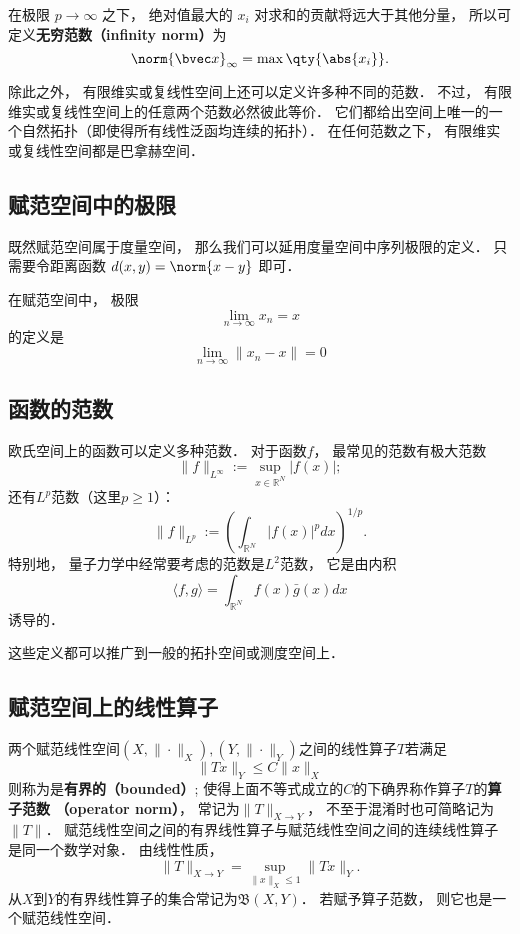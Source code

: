 在极限 $p \to \infty$ 之下， 绝对值最大的 $x_i$ 对求和的贡献将远大于其他分量， 所以可定义\textbf{无穷范数（infinity norm）}为
\begin{equation}
\norm{\bvec x}_\infty = \max \qty{\abs{x_i}}.
\end{equation}

除此之外， 有限维实或复线性空间上还可以定义许多种不同的范数． 不过， 有限维实或复线性空间上的任意两个范数必然彼此等价． 它们都给出空间上唯一的一个自然拓扑（即使得所有线性泛函均连续的拓扑）． 在任何范数之下， 有限维实或复线性空间都是巴拿赫空间．

\subsection{赋范空间中的极限}
既然赋范空间属于度量空间， 那么我们可以延用度量空间中序列极限的定义． 只需要令距离函数 $d(x, y) = \norm{x - y}$ 即可．

在赋范空间中， 极限
\begin{equation}
\lim_{n\to\infty} x_n = x
\end{equation}
的定义是
\begin{equation}
\lim_{n\to\infty} \|{x_n - x}\|= 0
\end{equation}

\subsection{函数的范数}
欧氏空间上的函数可以定义多种范数． 对于函数$f$， 最常见的范数有极大范数
$$
\|f\|_{L^\infty}:=\sup_{x\in\mathbb{R}^N}|f(x)|;
$$
还有$L^p$范数（这里$p\geq1$）：
$$
\|f\|_{L^p}:=\left(\int_{\mathbb{R}^N}|f(x)|^pdx\right)^{1/p}.
$$
特别地， 量子力学中经常要考虑的范数是$L^2$范数， 它是由内积
$$
\langle f,g\rangle=\int_{\mathbb{R}^N}f(x)\bar g(x)dx
$$
诱导的．

这些定义都可以推广到一般的拓扑空间或测度空间上．

\subsection{赋范空间上的线性算子}
两个赋范线性空间$(X,\|\cdot\|_X),(Y,\|\cdot\|_Y)$之间的线性算子$T$若满足
$$
\|Tx\|_Y\leq C\|x\|_X
$$
则称为是\textbf{有界的（bounded）}; 使得上面不等式成立的$C$的下确界称作算子$T$的\textbf{算子范数 （operator norm）}， 常记为$\|T\|_{X\to Y}$， 不至于混淆时也可简略记为$\|T\|$． 赋范线性空间之间的有界线性算子与赋范线性空间之间的连续线性算子是同一个数学对象． 由线性性质，
$$
\|T\|_{X\to Y}=\sup_{\|x\|_X\leq 1}\|Tx\|_Y.
$$
从$X$到$Y$的有界线性算子的集合常记为$\mathfrak{B}(X,Y)$． 若赋予算子范数， 则它也是一个赋范线性空间．

